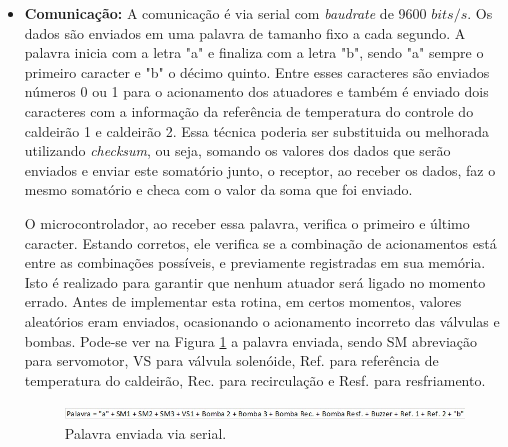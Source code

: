 \begin{itemize}
\item \textbf{Comunicação:}
A comunicação é via serial com \textit{baudrate} de 9600 $bits/s$. Os dados são enviados em uma palavra de tamanho fixo a cada segundo. A palavra inicia com a letra "a" e finaliza com a letra "b", sendo "a" sempre o primeiro caracter e "b" o décimo quinto. Entre esses caracteres são enviados números 0 ou 1 para o acionamento dos atuadores e também é enviado dois caracteres com a informação da referência de temperatura do controle do caldeirão 1 e caldeirão 2. Essa técnica poderia ser substituida ou melhorada utilizando \textit{checksum}, ou seja, somando os valores dos dados que serão enviados e enviar este somatório junto, o receptor, ao receber os dados, faz o mesmo somatório e checa com o valor da soma que foi enviado.

O microcontrolador, ao receber essa palavra, verifica o primeiro e último caracter. Estando corretos, ele verifica se a combinação de acionamentos está entre as combinações possíveis, e previamente registradas em sua memória. Isto é realizado para garantir que nenhum atuador será ligado no momento errado. Antes de implementar esta rotina, em certos momentos, valores aleatórios eram enviados, ocasionando o acionamento incorreto das válvulas e bombas. Pode-se ver na Figura \ref{palavra} a palavra enviada, sendo SM abreviação para servomotor, VS para válvula solenóide, Ref. para referência de temperatura do caldeirão, Rec. para recirculação e Resf. para resfriamento.

\begin{figure}[htb]
	\caption{\label{palavra}Palavra enviada via serial.}
	\begin{center}
	    \includegraphics[width=1\linewidth]{./img/palavra.jpg}
	\end{center}
\end{figure}

\end{itemize}

